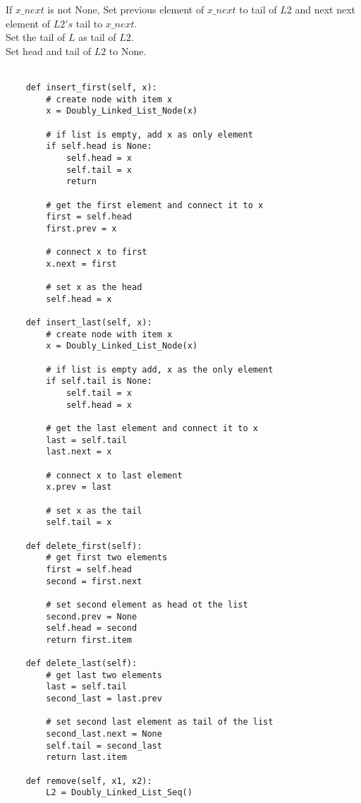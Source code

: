 \documentclass[12pt,twoside]{article}
\begin{document}
\begin{problems}
\begin{problemparts}
If $x\_next$ is not None, Set previous element of $x\_next$ to tail of $L2$ and next next element of $L2's$ tail to $x\_next$. \\
Set the tail of $L$ as tail of $L2$. \\
Set head and tail of $L2$ to None. \\
\newpage
\problempart 
\\
\begin{lstlisting}
    def insert_first(self, x):
        # create node with item x
        x = Doubly_Linked_List_Node(x)

        # if list is empty, add x as only element
        if self.head is None:
            self.head = x
            self.tail = x
            return

        # get the first element and connect it to x
        first = self.head
        first.prev = x

        # connect x to first
        x.next = first

        # set x as the head
        self.head = x

    def insert_last(self, x):
        # create node with item x
        x = Doubly_Linked_List_Node(x)

        # if list is empty add, x as the only element
        if self.tail is None:
            self.tail = x
            self.head = x

        # get the last element and connect it to x
        last = self.tail
        last.next = x

        # connect x to last element
        x.prev = last

        # set x as the tail
        self.tail = x

    def delete_first(self):
        # get first two elements
        first = self.head
        second = first.next

        # set second element as head ot the list
        second.prev = None
        self.head = second
        return first.item

    def delete_last(self):
        # get last two elements
        last = self.tail
        second_last = last.prev

        # set second last element as tail of the list
        second_last.next = None
        self.tail = second_last
        return last.item

    def remove(self, x1, x2):
        L2 = Doubly_Linked_List_Seq()


\end{lstlisting}
\end{problemparts}
\end{problems}
\end{document}
